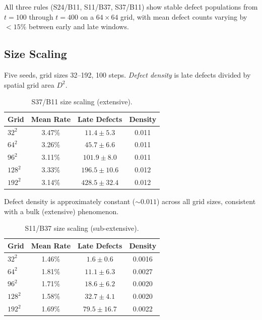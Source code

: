 \documentclass[letterpaper]{article}
\theoremstyle{definition}
\theoremstyle{remark}
\begin{document}
All three rules (S24/B11, S11/B37, S37/B11) show stable defect populations from $t{=}100$ through $t{=}400$ on a $64 \times 64$ grid, with mean defect counts varying by $<15\%$ between early and late windows.

\subsection{Size Scaling}

Five seeds, grid sizes 32--192, 100 steps.
\emph{Defect density} is late defects divided by spatial grid area $D^2$.

\begin{table}[!htb]
\centering
\caption{S37/B11 size scaling (extensive).}\label{tab:s37b11-scale}
\begin{tabular}{lccc}
\toprule
Grid & Mean Rate & Late Defects & Density \\
\midrule
$32^2$  & 3.47\% & $11.4 \pm 5.3$  & 0.011 \\
$64^2$  & 3.26\% & $45.7 \pm 6.6$  & 0.011 \\
$96^2$  & 3.11\% & $101.9 \pm 8.0$ & 0.011 \\
$128^2$ & 3.33\% & $196.5 \pm 10.6$ & 0.012 \\
$192^2$ & 3.14\% & $428.5 \pm 32.4$ & 0.012 \\
\bottomrule
\end{tabular}
\end{table}

Defect density is approximately constant (${\sim}0.011$) across all grid sizes, consistent with a bulk (extensive) phenomenon.

\begin{table}[!htb]
\centering
\caption{S11/B37 size scaling (sub-extensive).}\label{tab:s11b37-scale}
\begin{tabular}{lccc}
\toprule
Grid & Mean Rate & Late Defects & Density \\
\midrule
$32^2$  & 1.46\% & $1.6 \pm 0.6$   & 0.0016 \\
$64^2$  & 1.81\% & $11.1 \pm 6.3$  & 0.0027 \\
$96^2$  & 1.71\% & $18.6 \pm 6.2$  & 0.0020 \\
$128^2$ & 1.58\% & $32.7 \pm 4.1$  & 0.0020 \\
$192^2$ & 1.69\% & $79.5 \pm 16.7$ & 0.0022 \\
\bottomrule
\end{tabular}
\end{table}
\end{document}
